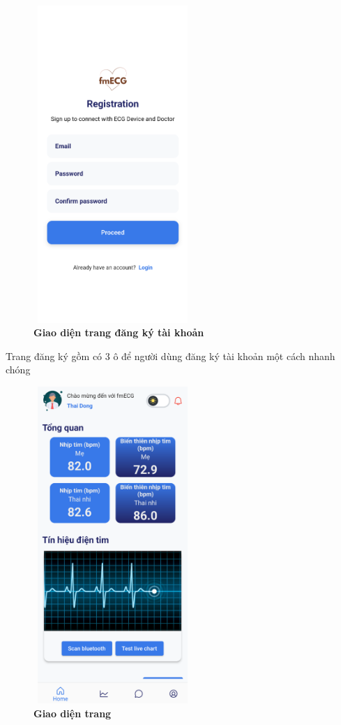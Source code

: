 \begin{figure}[H]
  \centering
  \includegraphics[width=6cm,height=12cm]{Images/mobile_app/demo/register.png}
  \caption[Giao diện trang đăng ký tài khoản]{\bfseries \fontsize{12pt}{0pt}\selectfont Giao diện trang đăng ký tài khoản}
  \label{demo_register} %
\end{figure}

Trang đăng ký gồm có 3 ô để người dùng đăng ký tài khoản một cách nhanh chóng

\begin{figure}[H]
  \centering
  \includegraphics[width=6cm,height=12cm]{Images/mobile_app/demo/home_screen.png}
  \caption[Giao diện trang]{\bfseries \fontsize{12pt}{0pt}\selectfont Giao diện trang}
  \label{demo_} %
\end{figure}

